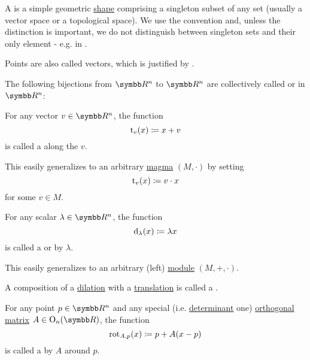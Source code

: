 \begin{definition}\label{def:point}
  A  is a simple geometric \hyperref[def:geometric_shape]{shape} comprising a singleton subset of any set (usually a vector space or a topological space). We use the convention  and, unless the distinction is important, we do not distinguish between singleton sets and their only element - e.g. in .

  Points are also called vectors, which is justified by .
\end{definition}

\begin{definition}\label{def:euclidean_transformation}
  The following bijections from \( \BR^n \) to \( \BR^n \) are collectively called  or  in \( \BR^n \):

  \begin{DefEnum}
     For any vector \( v \in \BR^n \), the function
    \begin{equation*}
      \operatorname{t}_v(x) \coloneqq x + v
    \end{equation*}
    is called a  along the  \( v \).

    This easily generalizes to an arbitrary \hyperref[def:magma/magma]{magma} \( (M, \cdot) \) by setting
    \begin{equation*}
      \operatorname{t}_v(x) \coloneqq v \cdot x
    \end{equation*}
    for some \( v \in M \).

     For any scalar \( \lambda \in \BR^n \), the function
    \begin{equation*}
      \operatorname{d}_\lambda(x) \coloneqq \lambda x
    \end{equation*}
    is called a  or  by \( \lambda \).

    This easily generalizes to an arbitrary (left) \hyperref[def:magma/magma]{module} \( (M, +, \cdot) \).

     A composition of a \hyperref[def:euclidean_transformation/dilation]{dilation} with a \hyperref[def:euclidean_transformation/translation]{translation} is called a .

     For any point \( p \in \BR^n \) and any special (i.e. \hyperref[def:matrix_determinant]{determinant} one) \hyperref[def:orthogonal_matrix]{orthogonal matrix} \( A \in \OO_n(\BR) \), the function
    \begin{equation*}
      \operatorname{rot}_{A,p}(x) \coloneqq p + A (x - p)
    \end{equation*}
    is called a  by \( A \) around \( p \).


\end{DefEnum}
\end{definition}
